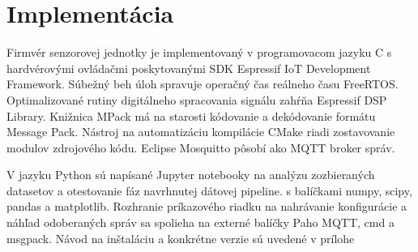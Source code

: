 \chapter{Implementácia}
Firmvér senzorovej jednotky je implementovaný v programovacom jazyku C s hardvérovými ovládačmi poskytovanými
SDK Espressif IoT Development Framework. Súbežný beh úloh spravuje operačný čas reálneho času FreeRTOS.
Optimalizované rutiny digitálneho spracovania signálu zahŕňa Espressif DSP Library. Knižnica MPack má na starosti
kódovanie a dekódovanie formátu Message Pack. Nástroj na automatizáciu kompilácie CMake riadi zostavovanie modulov zdrojového
kódu. Eclipse Mosquitto pôsobí ako MQTT broker správ.

V jazyku Python sú napísané Jupyter notebooky na analýzu zozbieraných datasetov a otestovanie fáz navrhnutej dátovej pipeline.
s balíčkami numpy, scipy, pandas a matplotlib. Rozhranie príkazového riadku na nahrávanie konfigurácie a náhľad odoberaných
správ sa spolieha na externé balíčky Paho MQTT, cmd a msgpack. Návod na inštaláciu a konkrétne verzie sú uvedené v prílohe

